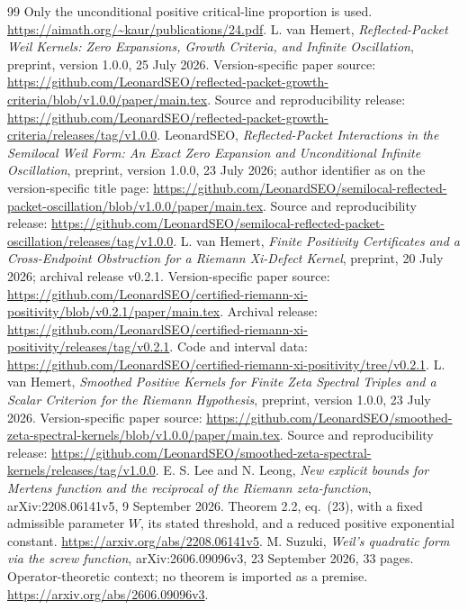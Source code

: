 \documentclass[11pt]{article}
\theoremstyle{remark}\newtheorem{remark}[theorem]{Remark}
\begin{document}
\begin{thebibliography}{99}
Only the unconditional positive critical-line proportion is used.
\url{https://aimath.org/~kaur/publications/24.pdf}.
 L. van Hemert,
\emph{Reflected-Packet Weil Kernels: Zero Expansions, Growth Criteria,
and Infinite Oscillation}, preprint, version 1.0.0, 25 July 2026.
Version-specific paper source:
\url{https://github.com/LeonardSEO/reflected-packet-growth-criteria/blob/v1.0.0/paper/main.tex}.
Source and reproducibility release:
\url{https://github.com/LeonardSEO/reflected-packet-growth-criteria/releases/tag/v1.0.0}.
 LeonardSEO,
\emph{Reflected-Packet Interactions in the Semilocal Weil Form:
An Exact Zero Expansion and Unconditional Infinite Oscillation},
preprint, version 1.0.0, 23 July 2026; author identifier as on
the version-specific title page:
\url{https://github.com/LeonardSEO/semilocal-reflected-packet-oscillation/blob/v1.0.0/paper/main.tex}.
Source and reproducibility release:
\url{https://github.com/LeonardSEO/semilocal-reflected-packet-oscillation/releases/tag/v1.0.0}.
 L. van Hemert,
\emph{Finite Positivity Certificates and a Cross-Endpoint Obstruction
for a Riemann Xi-Defect Kernel}, preprint, 20 July 2026;
archival release v0.2.1.
Version-specific paper source:
\url{https://github.com/LeonardSEO/certified-riemann-xi-positivity/blob/v0.2.1/paper/main.tex}.
Archival release:
\url{https://github.com/LeonardSEO/certified-riemann-xi-positivity/releases/tag/v0.2.1}.
Code and interval data:
\url{https://github.com/LeonardSEO/certified-riemann-xi-positivity/tree/v0.2.1}.
 L. van Hemert,
\emph{Smoothed Positive Kernels for Finite Zeta Spectral Triples
and a Scalar Criterion for the Riemann Hypothesis},
preprint, version 1.0.0, 23 July 2026.
Version-specific paper source:
\url{https://github.com/LeonardSEO/smoothed-zeta-spectral-kernels/blob/v1.0.0/paper/main.tex}.
Source and reproducibility release:
\url{https://github.com/LeonardSEO/smoothed-zeta-spectral-kernels/releases/tag/v1.0.0}.
 E. S. Lee and N. Leong,
\emph{New explicit bounds for Mertens function and the reciprocal
of the Riemann zeta-function}, arXiv:2208.06141v5,
9 September 2026. Theorem 2.2, eq.~(23), with a fixed
admissible parameter \(W\), its stated threshold, and a reduced
positive exponential constant.
\url{https://arxiv.org/abs/2208.06141v5}.
 M. Suzuki,
\emph{Weil's quadratic form via the screw function},
arXiv:2606.09096v3, 23 September 2026, 33 pages.
Operator-theoretic context; no theorem is imported as a premise.
\url{https://arxiv.org/abs/2606.09096v3}.
\end{thebibliography}
\end{document}
